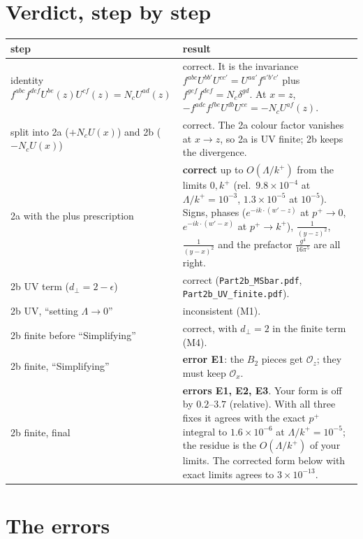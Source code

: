 \documentclass[10pt]{article}
\numberwithin{equation}{section}
\newcommand{\Ox}{\mathcal O_x}
\newcommand{\Oz}{\mathcal O_z}
\begin{document}
\section{Verdict, step by step}
\begin{center}\small
\begin{longtable}{@{}p{}p{}@{}}\toprule
step & result\\\midrule
identity $f^{abc}f^{def}U^{be}(z)U^{cf}(z)=N_cU^{ad}(z)$ & correct. It is the invariance $f^{abc}U^{bb'}U^{cc'}=U^{aa'}f^{a'b'c'}$ plus $f^{gef}f^{def}=N_c\delta^{gd}$. At $x=z$, $-f^{adc}f^{fbe}U^{db}U^{ce}=-N_cU^{af}(z)$.\\
split into 2a ($+N_cU(x)$) and 2b ($-N_cU(x)$) & correct. The 2a colour factor vanishes at $x\to z$, so 2a is UV finite; 2b keeps the divergence.\\
2a with the plus prescription & \textbf{correct} up to $O(\Lambda/k^+)$ from the limits $0,k^+$ (rel.\ $9.8\times10^{-4}$ at $\Lambda/k^+=10^{-3}$, $1.3\times10^{-5}$ at $10^{-5}$). Signs, phases ($e^{-ik\cdot(w'-z)}$ at $p^+\to0$, $e^{-ik\cdot(w'-x)}$ at $p^+\to k^+$), $\frac{1}{(y-z)^2}$, $\frac{1}{(y-x)^2}$ and the prefactor $\frac{g^4}{16\pi^5}$ are all right.\\
2b UV term ($d_\perp=2-\epsilon$) & correct (\texttt{Part2b\_MSbar.pdf}, \texttt{Part2b\_UV\_finite.pdf}).\\
2b UV, ``setting $\Lambda\to0$'' & inconsistent (M1).\\
2b finite before ``Simplifying'' & correct, with $d_\perp=2$ in the finite term (M4).\\
2b finite, ``Simplifying'' & \textbf{error E1}: the $B_2$ pieces get $\Oz$; they must keep $\Ox$.\\
2b finite, final & \textbf{errors E1, E2, E3}. Your form is off by $0.2$--$3.7$ (relative). With all three fixes it agrees with the exact $p^+$ integral to $1.6\times10^{-6}$ at $\Lambda/k^+=10^{-5}$; the residue is the $O(\Lambda/k^+)$ of your limits. The corrected form below with exact limits agrees to $3\times10^{-13}$.\\\bottomrule
\end{longtable}
\end{center}

\section{The errors}
\end{document}
